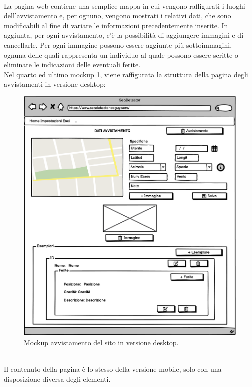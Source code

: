 \documentclass[a4paper,final,12pt]{report}
\begin{document}
\\La pagina web contiene una semplice mappa in cui vengono raffigurati i luoghi dell'avvistamento e, per ognuno, vengono mostrati i relativi dati, che sono modificabili al fine di variare le informazioni precedentemente inserite. In aggiunta, per ogni avvistamento, c'è la possibilità di aggiungere immagini e di cancellarle. Per ogni immagine possono essere aggiunte più sottoimmagini, ognuna delle quali rappresenta un individuo al quale possono essere scritte o eliminate le indicazioni delle eventuali ferite.\\
Nel quarto ed ultimo mockup \ref{figura:singleAvv}, viene raffigurata la struttura della pagina degli avvistamenti in versione desktop:
\begin{figure}[hbtp]
\centering
\includegraphics[scale=0.47]{img_concettuale/avvistamentoDesk.png}
\caption{Mockup avvistamento del sito in versione desktop.}
\label{figura:singleAvv}
\end{figure}
\\Il contenuto della pagina è lo stesso della versione mobile, solo con una disposizione diversa degli elementi.
\end{document}

